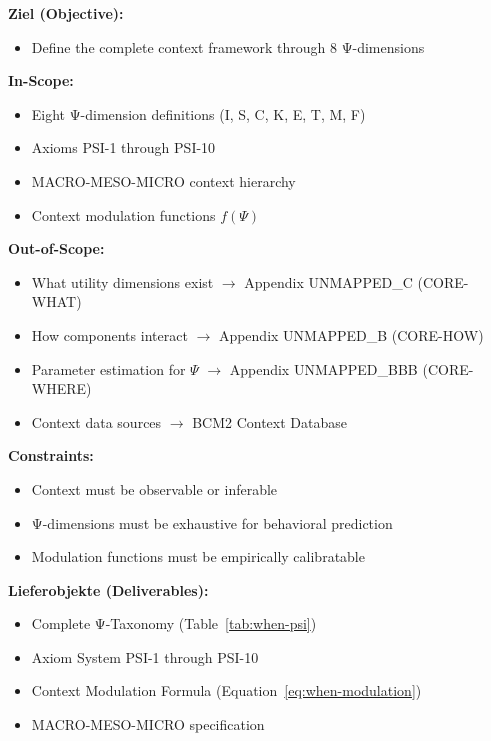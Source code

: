 
\begin{tcolorbox}[
    colback=orange!5!white,
    colframe=orange!75!black,
    title={\textbf{Appendix Scope: Ziel / In-Scope / Out-of-Scope / Constraints}},
    fonttitle=\bfseries
]

\textbf{Ziel (Objective):}
\begin{itemize}[nosep]
    \item Define the complete context framework through 8 Ψ-dimensions
\end{itemize}

\textbf{In-Scope:}
\begin{itemize}[nosep]
    \item Eight Ψ-dimension definitions (I, S, C, K, E, T, M, F)
    \item Axioms PSI-1 through PSI-10
    \item MACRO-MESO-MICRO context hierarchy
    \item Context modulation functions $f(\Psi)$
\end{itemize}

\textbf{Out-of-Scope:}
\begin{itemize}[nosep]
    \item What utility dimensions exist $\rightarrow$ Appendix UNMAPPED_C (CORE-WHAT)
    \item How components interact $\rightarrow$ Appendix UNMAPPED_B (CORE-HOW)
    \item Parameter estimation for $\Psi$ $\rightarrow$ Appendix UNMAPPED_BBB (CORE-WHERE)
    \item Context data sources $\rightarrow$ BCM2 Context Database
\end{itemize}

\textbf{Constraints:}
\begin{itemize}[nosep]
    \item Context must be observable or inferable
    \item Ψ-dimensions must be exhaustive for behavioral prediction
    \item Modulation functions must be empirically calibratable
\end{itemize}

\textbf{Lieferobjekte (Deliverables):}
\begin{itemize}[nosep]
    \item Complete Ψ-Taxonomy (Table~\ref{tab:when-psi})
    \item Axiom System PSI-1 through PSI-10
    \item Context Modulation Formula (Equation~\ref{eq:when-modulation})
    \item MACRO-MESO-MICRO specification
\end{itemize}

\end{tcolorbox}

